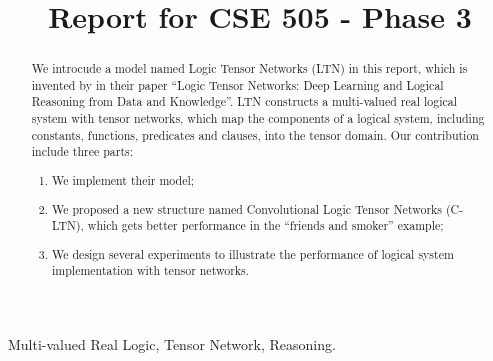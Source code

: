 \documentclass[conference]{IEEEtran}
\begin{document}
%
\title{Report for CSE 505 - Phase 3}


\author{
}

\maketitle


\begin{abstract}
We introcude a model named Logic Tensor Networks (LTN) in this report, which is invented by \cite{serafini2016logic} in their paper ``Logic Tensor Networks: Deep Learning and Logical Reasoning from Data and Knowledge''.
LTN constructs a multi-valued real logical system \cite{bergmann2008introduction} with tensor networks, which map the components of a logical system, including constants, functions, predicates and clauses, into  the tensor domain.
Our contribution include three parts:
\begin{enumerate}
    \item We implement their model;
    \item We proposed a new structure named Convolutional Logic Tensor Networks (C-LTN), which gets better performance in the ``friends and smoker'' example;
    \item We design several experiments to illustrate the performance of logical system implementation with tensor networks.
\end{enumerate}
\end{abstract}

\begin{IEEEkeywords}
Multi-valued Real Logic, Tensor Network, Reasoning.
\end{IEEEkeywords}


















\end{document}
